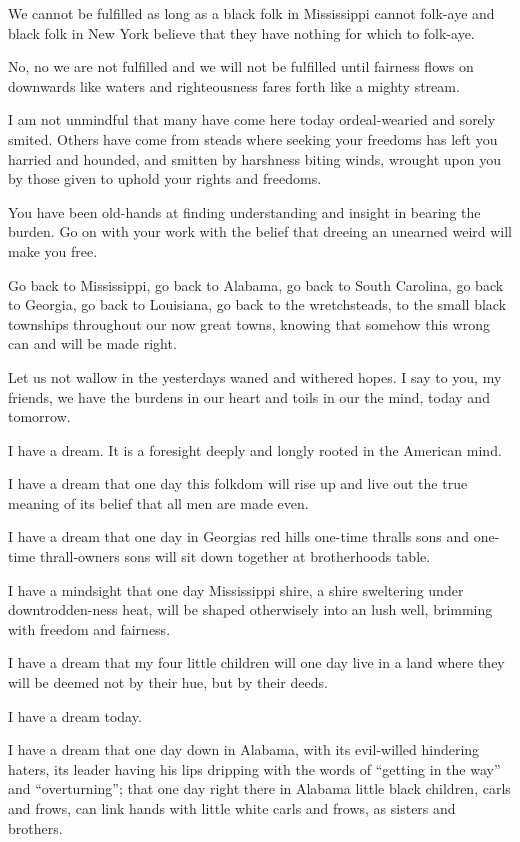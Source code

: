 We cannot be fulfilled as long as a black folk in Mississippi
cannot folk-aye and black folk in New York believe that they have
nothing for which to folk-aye.

No, no we are not fulfilled and we will not be fulfilled until
fairness flows on downwards like waters and righteousness fares
forth like a mighty stream.

I am not unmindful that many have come here today ordeal-wearied
and sorely smited. Others have come from steads where seeking your
freedoms has left you harried and hounded, and smitten by
harshness\textquotesingle{} biting winds, wrought upon you by
those given to uphold your rights and freedoms.

You have been old-hands at finding understanding and insight in
bearing the burden. Go on with your work with the belief that
dreeing an unearned weird will make you free.

Go back to Mississippi, go back to Alabama, go back to South
Carolina, go back to Georgia, go back to Louisiana, go back to the
wretchsteads, to the small black townships throughout our now
great towns, knowing that somehow this wrong can and will be made
right.

Let us not wallow in the yesterday\textquotesingle{}s waned and
withered hopes. I say to you, my friends, we have the burdens in
our heart and toils in our the mind, today and tomorrow.

I have a dream. It is a foresight deeply and longly rooted in the
American mind.

I have a dream that one day this folkdom will rise up and live out
the true meaning of its belief that all men are made even.

I have a dream that one day in Georgia\textquotesingle{}s red
hills one-time thralls\textquotesingle{} sons and one-time
thrall-owners\textquotesingle{} sons will sit down together at
brotherhood\textquotesingle{}s table.

I have a mindsight that one day Mississippi shire, a shire
sweltering under downtrodden-ness\textquotesingle{} heat, will be
shaped otherwisely into an lush well, brimming with freedom and
fairness.

I have a dream that my four little children will one day live in a
land where they will be deemed not by their hue, but by their
deeds.

I have a dream today.

I have a dream that one day down in Alabama, with
it\textquotesingle{}s evil-willed hindering haters, its leader
having his lips dripping with the words of ``getting in the way''
and ``overturning''; that one day right there in Alabama little
black children, carls and frows, can link hands with little white
carls and frows, as sisters and brothers.

